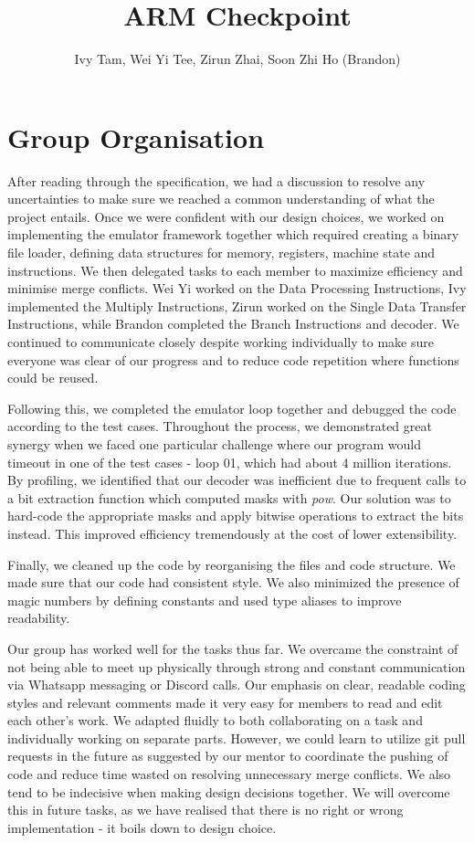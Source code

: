 \documentclass[11pt]{article}
\begin{document}
\title{ARM Checkpoint}
\author{Ivy Tam, Wei Yi Tee, Zirun Zhai, Soon Zhi Ho (Brandon)}

\maketitle

\section{Group Organisation}

After reading through the specification, we had a discussion to resolve any uncertainties to make sure we reached a common understanding of what the project entails. Once we were confident with our design choices, we worked on implementing the emulator framework together which required creating a binary file loader, defining data structures for memory, registers, machine state and instructions. We then delegated tasks to each member to maximize efficiency and minimise merge conflicts. Wei Yi worked on the Data Processing Instructions, Ivy implemented the Multiply Instructions, Zirun worked on the Single Data Transfer Instructions, while Brandon completed the Branch Instructions and decoder. We continued to communicate closely despite working individually to make sure everyone was clear of our progress and to reduce code repetition where functions could be reused. \par 
Following this, we completed the emulator loop together and debugged the code according to the test cases. Throughout the process, we demonstrated great synergy when we faced one particular challenge where our program would timeout in one of the test cases - loop 01, which had about 4 million iterations. By profiling, we identified that our decoder was inefficient due to frequent calls to a bit extraction function which computed masks with \emph{pow}. Our solution was to hard-code the appropriate masks and apply bitwise operations to extract the bits instead. This improved efficiency tremendously at the cost of lower extensibility.\par 
Finally, we cleaned up the code by reorganising the files and code structure. We made sure that our code had consistent style. We also minimized the presence of magic numbers by defining constants and used type aliases to improve readability. \par
Our group has worked well for the tasks thus far. We overcame the constraint of not being able to meet up physically through strong and constant communication via Whatsapp messaging or Discord calls. Our emphasis on clear, readable coding styles and relevant comments made it very easy for members to read and edit each other’s work. We adapted fluidly to both collaborating on a task and individually working on separate parts. However, we could learn to utilize git pull requests in the future as suggested by our mentor to coordinate the pushing of code and reduce time wasted on resolving unnecessary merge conflicts. We also tend to be indecisive when making design decisions together. We will overcome this in future tasks, as we have realised that there is no right or wrong implementation - it boils down to design choice. \par
\break
\end{document}
